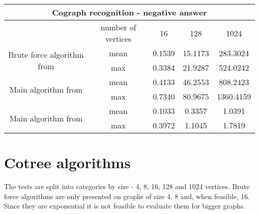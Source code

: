 \begin{center}

    \begin{tabular}{ |c|c|c|c|c|}
        \hline
        \multicolumn{5}{|c|}{Cograph recognition - negative answer}                                                  \\
        \hline
                                                                 & number of vertices & 16     & 128     & 1024      \\
        \hline
        \multirow{2}{*}{Brute force algorithm from \cite{habib}} & mean               & 0.1539 & 15.1173 & 283.3024  \\
                                                                 & max                & 0.3384 & 21.9287 & 524.0242  \\
        \hline
        \multirow{2}{*}{Main algorithm from \cite{habib}}        & mean               & 0.4133 & 46.2553 & 808.2423  \\
                                                                 & max                & 0.7340 & 80.9675 & 1360.4159 \\
        \hline
        \multirow{2}{*}{Main algorithm from \cite{corneil}}      & mean               & 0.1033 & 0.3357  & 1.0391    \\
                                                                 & max                & 0.3972 & 1.1045  & 1.7819    \\

        \hline
    \end{tabular}
\end{center}

\section{Cotree algorithms}

The tests are split into categories by size - 4, 8, 16, 128 and 1024  vertices. Brute force algorithms are only presented on graphs of size 4, 8 and, when feasible, 16. Since they are exponential it is not feasible to evaluate them for bigger graphs.

